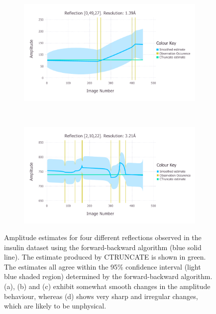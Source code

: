 \begin{figure}
    \ContinuedFloat
    \begin{subfigure}[b]{1.0\textwidth}
        \centering
        \includegraphics[width=\textwidth]{figures/datared/SmoothedPlot_0,49,27_res1.pdf}
        \caption{}
        \label{fig:Amplitude estimates ref 0,49,27 - insulin}
    \end{subfigure}
    \\
    \begin{subfigure}[b]{1.0\textwidth}
        \centering
        \includegraphics[width=\textwidth]{figures/datared/SmoothedPlot_2,10,22_res3.pdf}
        \caption{}
        \label{fig:Amplitude estimates ref 2,10,22 - insulin}
    \end{subfigure}
    \caption[Amplitude estimates for four different reflections observed in the insulin dataset using the forward-backward algorithm.]{Amplitude estimates for four different reflections observed in the insulin dataset using the forward-backward algorithm (blue solid line).
    The estimate produced by CTRUNCATE is shown in green.
    The estimates all agree within the 95\% confidence interval (light blue shaded region) determined by the forward-backward algorithm.
    (a), (b) and (c) exhibit somewhat smooth changes in the amplitude behaviour, whereas (d) shows very sharp and irregular changes, which are likely to be unphysical.}
    \label{fig:Amplitude estimates - insulin}
\end{figure}

